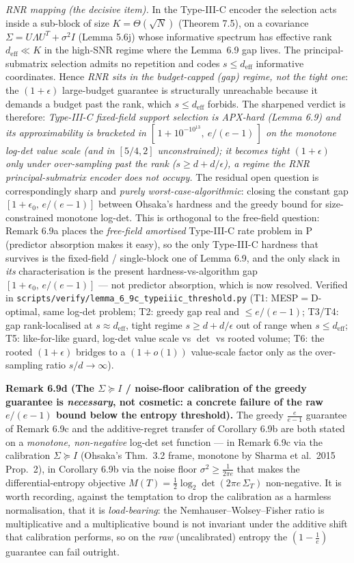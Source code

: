 \documentclass[
]{article}
\begin{document}
\emph{RNR mapping (the decisive item).} In the Type-III-C encoder the
selection acts inside a sub-block of size $K=\Theta(\sqrt N)$ (Theorem 7.5),
on a covariance $\Sigma=U\Lambda U^T+\sigma^2 I$ (Lemma 5.6j) whose informative
spectrum has effective rank $d_{\mathrm{eff}}\ll K$ in the high-SNR regime
where the Lemma~6.9 gap lives. The principal-submatrix selection admits no
repetition and codes $s\le d_{\mathrm{eff}}$ informative coordinates. Hence
\emph{RNR sits in the budget-capped (gap) regime, not the tight one}: the
$(1+\epsilon)$ large-budget guarantee is structurally unreachable because it
demands a budget past the rank, which $s\le d_{\mathrm{eff}}$ forbids. The
sharpened verdict is therefore: \emph{Type-III-C fixed-field support selection
is APX-hard (Lemma 6.9) and its approximability is bracketed in
$[\,1+10^{-10^{13}},\ e/(e-1)\,]$ on the monotone log-det value scale (and in
$[5/4,2]$ unconstrained); it becomes tight $(1+\epsilon)$ only under
over-sampling past the rank ($s\ge d+d/\epsilon$), a regime the RNR
principal-submatrix encoder does not occupy.} The residual open question is
correspondingly sharp and \emph{purely worst-case-algorithmic}: closing the
constant gap $[1+\epsilon_0,\,e/(e-1)]$ between Ohsaka's hardness and the greedy
bound for size-constrained monotone log-det. This is orthogonal to the
free-field question: Remark 6.9a places the \emph{free-field amortised}
Type-III-C rate problem in $\mathrm P$ (predictor absorption makes it easy),
so the only Type-III-C hardness that survives is the fixed-field /
single-block one of Lemma 6.9, and the only slack in \emph{its}
characterisation is the present hardness-vs-algorithm gap $[1+\epsilon_0,
\,e/(e-1)]$ --- not predictor absorption, which is now resolved. Verified
in \texttt{scripts/verify/lemma\_6\_9c\_typeiiic\_threshold.py} (T1:
MESP$=$D-optimal, same log-det problem; T2: greedy gap real and $\le e/(e-1)$;
T3/T4: gap rank-localised at $s\approx d_{\mathrm{eff}}$, tight regime
$s\ge d+d/\epsilon$ out of range when $s\le d_{\mathrm{eff}}$; T5:
like-for-like guard, log-det value scale vs $\det$ vs rooted volume; T6: the
rooted $(1+\epsilon)$ bridges to a $(1+o(1))$ value-scale factor only as the
over-sampling ratio $s/d\to\infty$).

\textbf{Remark 6.9d (The $\Sigma\succeq I$ / noise-floor calibration of the
greedy guarantee is \emph{necessary}, not cosmetic: a concrete failure of the
raw $e/(e-1)$ bound below the entropy threshold).} The greedy
$\tfrac{e}{e-1}$ guarantee of Remark 6.9c and the additive-regret transfer of
Corollary 6.9b are both stated on a \emph{monotone, non-negative} log-det set
function --- in Remark 6.9c via the calibration $\Sigma\succeq I$ (Ohsaka's
Thm.\ 3.2 frame, monotone by Sharma et al.\ 2015 Prop.\ 2), in Corollary 6.9b
via the noise floor $\sigma^2\ge\tfrac1{2\pi e}$ that makes the
differential-entropy objective $M(T)=\tfrac12\log_2\det(2\pi e\,\Sigma_T)$
non-negative. It is worth recording, against the temptation to drop the
calibration as a harmless normalisation, that it is \emph{load-bearing}: the
Nemhauser--Wolsey--Fisher ratio is multiplicative and a multiplicative bound is
not invariant under the additive shift that calibration performs, so on the
\emph{raw} (uncalibrated) entropy the $(1-\tfrac1e)$ guarantee can fail
outright.
\end{document}
